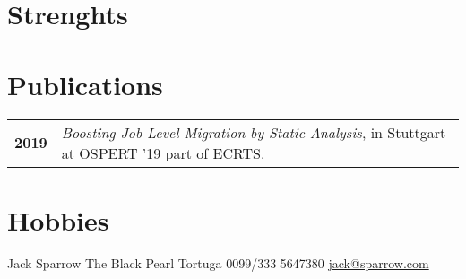 \documentclass[grey]{hipstercv}
\newlength{\rightcolwidth}
\begin{document}
\begin{paracol}{2}
\begin{minipage}[t]{0.3\textwidth}
\section*{Strenghts}
\end{minipage}\hfill
\begin{minipage}[t]{0.3\textwidth}
\section*{Publications}
\begin{tabular}{>{\footnotesize\bfseries}r >{\footnotesize}p{}}
    2019 & \emph{Boosting Job-Level Migration by Static Analysis}, in Stuttgart at OSPERT '19 part of ECRTS. \\
\end{tabular}
\section*{Hobbies}
\end{minipage}

\vfill{} %
\vspace{2em}

\setlength{\parindent}{0pt}
\begin{minipage}[t]{\rightcolwidth}
\begin{center}\fontfamily{\sfdefault}\selectfont \color{black!70}
{\small Jack Sparrow  The Black Pearl  Tortuga  0099/333 5647380 \newline{} \protect\url{jack@sparrow.com}
}
\end{center}
\end{minipage}


\end{paracol}
\end{document}
